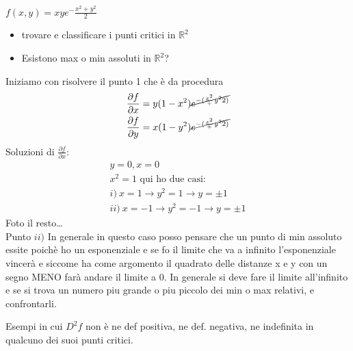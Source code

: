 \documentclass[a4paper, oneside]{article}
\begin{document}
        \begin{example}
            \hfil\\
    \begin{center}
    \end{center}
            $f(x,y) = xy e^-\frac{x^2+y^2}{2}$
            \begin{itemize}
                \item trovare e classificare i punti critici in $\mathbb{R}^2$
                \item Esistono max o min assoluti in $\mathbb{R}^2$?
            \end{itemize}
            Iniziamo con risolvere il punto 1 che è da procedura\\
            \begin{gather*}
                \frac{\partial f}{\partial x} = y(1-x^2) \cancel{e^{-(\frac{x^2}+y^2{2})}}\\
                \frac{\partial f}{\partial y} = x (1-y^2) \cancel{e^{-(\frac{x^2}+y^2{2})}}
            \end{gather*}
            Soluzioni di $\frac{\partial f}{\partial x}$:
            \begin{gather*}
                y = 0 , x =0 \\
                x^2 = 1 \text{ qui ho due casi:}\\
                i) \ x = 1 \to y^2 = 1 \to y = \pm 1\\
                ii) \ x = -1 \to y^2 = -1 \to y = \pm 1
            \end{gather*}
            Foto il resto\dots      \\
            Punto $ii)$ In generale in questo caso posso pensare che un punto di min assoluto essite poichè ho un esponenziale e se fo il limite che va a infinito l'esponenziale vincerà e siccome ha come argomento il quadrato delle distanze x e y con un segno MENO farà andare il limite a 0.
            In generale si deve fare il limite all'infinito e se si trova un numero piu grande o piu piccolo dei min o max relativi, e confrontarli.
        \end{example}
        Esempi in cui $D^2 f$ non è ne def positiva, ne def. negativa, ne indefinita in qualcuno dei suoi punti critici.\\
\end{document}

